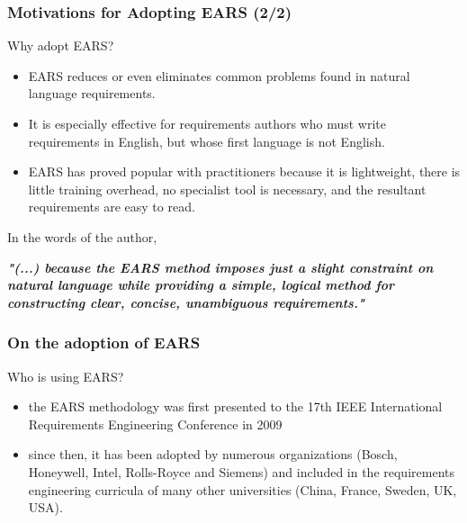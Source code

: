 \documentclass[aspectratio=169]{beamer}
\begin{document}
%
\begin{frame}
  \frametitle{Motivations for Adopting EARS (2/2)}
  \begin{block}{Why adopt EARS?}
  \begin{itemize}
    \item EARS reduces or even eliminates common problems found in natural language requirements. 
    \item It is especially effective for requirements authors who must write requirements in English, but whose first language is not English. 
    \item EARS has proved popular with practitioners because it is lightweight, there is little training overhead, no specialist tool is necessary, and the resultant requirements are easy to read.
  \end{itemize}
  \end{block} 
  In the words of the author, \begin{alert}
  {{\it {\bf "(...) because the EARS method imposes just a slight constraint on natural language while providing a simple, logical method for constructing clear, concise, unambiguous requirements."}}}
  \end{alert}

\end{frame}
%
\begin{frame}
  \frametitle{On the adoption of EARS}
  \begin{block}{Who is using EARS?}
  \begin{itemize}
    \item the EARS methodology was first presented to the 17th IEEE International Requirements Engineering Conference in 2009
    \item since then, it has been adopted by numerous organizations (Bosch, Honeywell, Intel, Rolls-Royce and Siemens) and included in the requirements engineering curricula of many other universities (China, France, Sweden, UK, USA). %
  \end{itemize}
  \end{block} 
\end{frame}
%
%
%
\end{document}
